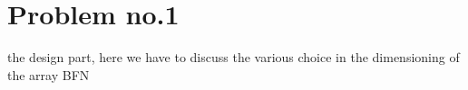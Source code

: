 \section{Problem no.1}
the design part, here we have to discuss the various choice in the dimensioning of the array BFN